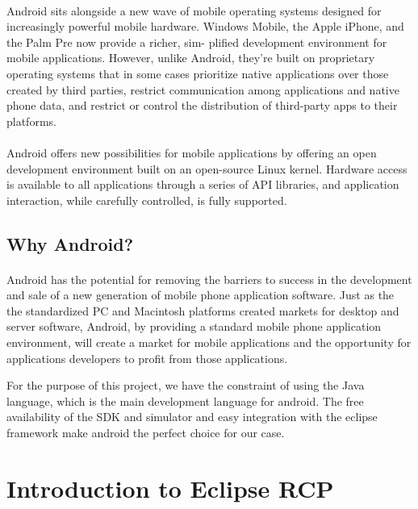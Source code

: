 \paragraph{}
Android sits alongside a new wave of mobile operating systems designed for increasingly powerful
mobile hardware. Windows Mobile, the Apple iPhone, and the Palm Pre now provide a richer, sim-
plified development environment for mobile applications. However, unlike Android, they’re built on
proprietary operating systems that in some cases prioritize native applications over those created by
third parties, restrict communication among applications and native phone data, and restrict or control
the distribution of third-party apps to their platforms.
\paragraph{}
Android offers new possibilities for mobile applications by offering an open development environment
built on an open-source Linux kernel. Hardware access is available to all applications through a series
of API libraries, and application interaction, while carefully controlled, is fully supported.


\subsection{Why Android?}
\paragraph{}
Android has the potential for removing the barriers to success in the development and
sale of a new generation of mobile phone application software. Just as the the standardized 
PC and Macintosh platforms created markets for desktop and server software,
Android, by providing a standard mobile phone application environment, will create
a market for mobile applications and the opportunity for applications developers to
profit from those applications.

For the purpose of this project, we have the constraint of using the Java language, which is the main
development language for android. The free availability of the SDK and simulator and easy integration 
with the eclipse framework make android the perfect choice for our case.

\section{Introduction to Eclipse RCP}
